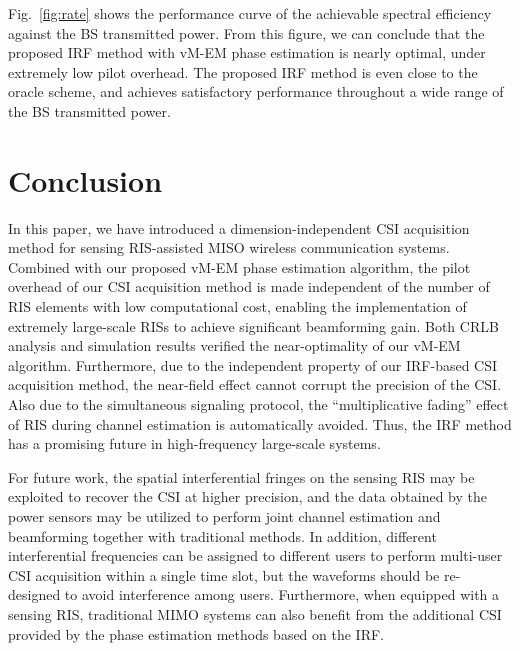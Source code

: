 \documentclass[journal,twocolumn]{IEEEtran}
\theoremstyle{nonumberplain}
\begin{document}
    Fig.~\ref{fig:rate} shows the performance curve of the achievable spectral efficiency against the BS transmitted power. From this figure, we can conclude that the proposed IRF method with vM-EM phase estimation is nearly optimal, under extremely low pilot overhead. The proposed IRF method is even close to the oracle scheme, and achieves satisfactory performance throughout a wide range of the BS transmitted power. 


\section{Conclusion}
\label{Conclusion}
    In this paper, we have introduced a dimension-independent CSI acquisition method for sensing RIS-assisted MISO wireless communication systems. 
    Combined with our proposed vM-EM phase estimation algorithm, the pilot overhead of our CSI acquisition method is made independent of the number of RIS elements with low computational cost, enabling the implementation of extremely large-scale RISs to achieve significant beamforming gain. 
    Both CRLB analysis and simulation results verified the near-optimality of our vM-EM algorithm. 
    Furthermore, due to the independent property of our \ac{IRF}-based CSI acquisition method, the near-field effect cannot corrupt the precision of the CSI. 
    Also due to the simultaneous signaling protocol, the ``multiplicative fading'' effect of RIS \cite{zhang2021active,liu2021active} during channel estimation is automatically avoided. 
    Thus, the \ac{IRF} method has a promising future in high-frequency large-scale systems. 
    
    For future work, the spatial interferential fringes on the sensing RIS may be exploited to recover the CSI at higher precision, and the data obtained by the power sensors may be utilized to perform joint channel estimation and beamforming together with traditional methods. 
    In addition, different interferential frequencies can be assigned to different users to perform multi-user CSI acquisition within a single time slot, but the waveforms should be re-designed to avoid interference among users. 
    Furthermore, when equipped with a sensing RIS, traditional MIMO systems can also benefit from the additional CSI provided by the phase estimation methods based on the IRF.  

\appendices
\end{document}
